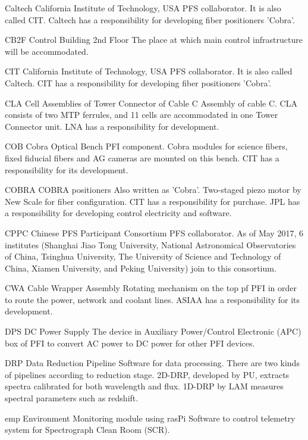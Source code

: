 {Caltech}
{California Institute of Technology, USA}
{PFS collaborator. It is also called CIT. Caltech has a responsibility for developing fiber positioners 'Cobra'.}


{CB2F}
{Control Building 2nd Floor}
{The place at which main control infrastructure will be accommodated.}


{CIT}
{California Institute of Technology, USA}
{PFS collaborator. It is also called Caltech. CIT has a responsibility for developing fiber positioners 'Cobra'.}


{CLA}
{Cell Assemblies of Tower Connector of Cable C}
{Assembly of cable C. CLA consists of two MTP ferrules, and 11 cells are accommodated in one Tower Connector unit. LNA has a responsibility for development.}


{COB}
{Cobra Optical Bench}
{PFI component. Cobra modules for science fibers, fixed fiducial fibers and AG cameras are mounted on this bench. CIT has a responsibility for its development.}


{COBRA}
{COBRA positioners}
{Also written as 'Cobra'. Two-staged piezo motor by New Scale for fiber configuration. CIT has a responsibility for purchase. JPL has a responsibility for developing control electricity and software.}


{CPPC}
{Chinese PFS Participant Consortium}
{PFS collaborator. As of May 2017, 6 institutes (Shanghai Jiao Tong University, National Astronomical Observatories of China, Tsinghua University, The University of Science and Technology of China, Xiamen University, and Peking University) join to this consortium.}


{CWA}
{Cable Wrapper Assembly}
{Rotating mechanism on the top pf PFI in order to route the power, network and coolant lines. ASIAA has a responsibility for its development.}


{DPS}
{DC Power Supply}
{The device in Auxiliary Power/Control Electronic (APC) box of PFI to convert AC power to DC power for other PFI devices.}


{DRP}
{Data Reduction Pipeline}
{Software for data processing. There are two kinds of pipelines according to reduction stage. 2D-DRP, developed by PU, extracts spectra calibrated for both wavelength and flux. 1D-DRP by LAM measures spectral parameters such as redshift.}


{emp}
{Environment Monitoring module using rasPi}
{Software to control telemetry system for Spectrograph Clean Room (SCR).}


